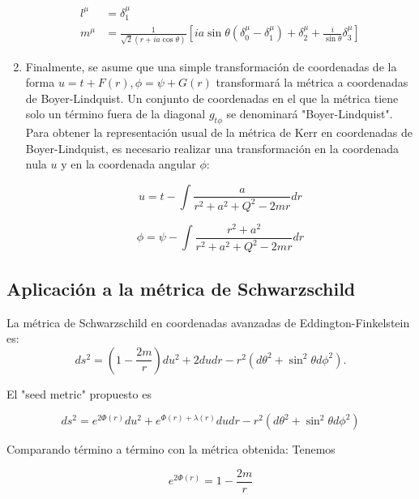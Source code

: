\begin{enumerate}[1.]
          \begin{equation}
              \begin{aligned}
                  l^\mu & = \delta_1^\mu     \\
                  m^\mu & = \frac{1}{\sqrt{2}(r + ia \cos \theta)} \left[ ia \sin \theta (\delta_0^\mu - \delta_1^\mu) + \delta_2^\mu + \frac{i}{\sin \theta} \delta_3^\mu \right]
              \end{aligned}
          \end{equation}

    \item Finalmente, se asume que una simple transformación de coordenadas de la forma $u = t + F(r), \phi = \psi + G(r)$ transformará la métrica a coordenadas de Boyer-Lindquist. Un conjunto de coordenadas en el que la métrica tiene solo un término fuera de la diagonal $g_{t \phi}$ se denominará "Boyer-Lindquist". Para obtener la representación usual de la métrica de Kerr en coordenadas de Boyer-Lindquist, es necesario realizar una transformación en la coordenada nula $u$ y en la coordenada angular $\phi$:

          $$
              u = t - \int \frac{a}{r^2 + a^2 + Q^2 - 2mr} dr
          $$

          $$
              \phi = \psi - \int \frac{r^2 + a^2}{r^2 + a^2 + Q^2 - 2mr} dr
          $$
\end{enumerate}

\subsection{Aplicación a la métrica de Schwarzschild}
La métrica de Schwarzschild en coordenadas avanzadas de Eddington-Finkelstein es:
\begin{equation}
    ds^2=\left(1-\frac{2 m}{r}\right) d u^2+2 d u d r-r^2\left(d \theta^2+\sin ^2 \theta d \phi^2\right) .
\end{equation}

El "seed metric" propuesto es

\begin{equation}
    d s^2=e^{2 \Phi(r)} d u^2+e^{\Phi(r)+\lambda(r)} d u d r-r^2\left(d \theta^2+\sin ^2 \theta d \phi^2\right)
\end{equation}

Comparando término a término con la métrica obtenida:
Tenemos

\begin{equation}
    e^{2 \Phi(r)}=1-\frac{2 m}{r}
\end{equation}

